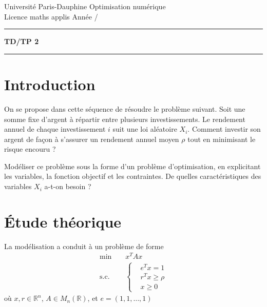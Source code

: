 \documentclass[10pt,a4paper,fleqn]{report}
\makeatletter
\def\cleardoublepage{\clearpage\if@twoside\ifodd\c@page\else\hbox{}\thispagestyle{empty}\newpage\fi\fi}
\newcommand{\R}{\mathbb R}
\makeatother
\begin{document}
\cleardoublepage

\noindent
Universit\'e Paris-Dauphine     \hfill      Optimisation num\'erique\\
Licence maths applis      \hfill      Ann\'ee /

\medskip

\hrule

\medskip



\begin{center}

\textbf{\huge TD/TP 2}

\smallskip

\rule{10cm}{0.4pt}

\end{center}

\section{Introduction}
On se propose dans cette séquence de résoudre le problème
suivant. Soit une somme fixe d'argent à répartir entre plusieurs
investissements. Le rendement annuel de chaque investissement $i$ suit
une loi aléatoire $X_{i}$. Comment investir son argent de façon à
s'assurer un rendement annuel moyen $\rho$ tout en minimisant le
risque encouru ?

Modéliser ce problème sous la forme d'un problème d'optimisation, en
explicitant les variables, la fonction objectif et les contraintes. De
quelles caractéristiques des variables $X_{i}$ a-t-on besoin ?

\section{Étude théorique}
La modélisation a conduit à un problème de forme
\begin{align*}
  \text{min} \;\;\;\;&x^{T} A x\\
  \text{s.c.}\;\;\;\;&\begin{cases}
    &e^{T} x = 1\\
  &r^{T} x \geq \rho\\
  &x \geq 0
  \end{cases}
\end{align*}
où $x, r \in \R^{n}$, $A \in M_{n}(\R)$, et $e = (1,1,\dots,1)$
\end{document}
